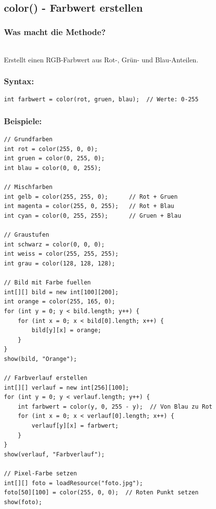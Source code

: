 \newpage


\subsection*{color() - Farbwert erstellen}

\subsubsection*{Was macht die Methode?}\\
Erstellt einen RGB-Farbwert aus Rot-, Grün- und Blau-Anteilen.

\subsubsection*{Syntax:}
\begin{lstlisting}
int farbwert = color(rot, gruen, blau);  // Werte: 0-255
\end{lstlisting}

\subsubsection*{Beispiele:}
\begin{lstlisting}
// Grundfarben
int rot = color(255, 0, 0);
int gruen = color(0, 255, 0);
int blau = color(0, 0, 255);

// Mischfarben
int gelb = color(255, 255, 0);      // Rot + Gruen
int magenta = color(255, 0, 255);   // Rot + Blau
int cyan = color(0, 255, 255);      // Gruen + Blau

// Graustufen
int schwarz = color(0, 0, 0);
int weiss = color(255, 255, 255);
int grau = color(128, 128, 128);

// Bild mit Farbe fuellen
int[][] bild = new int[100][200];
int orange = color(255, 165, 0);
for (int y = 0; y < bild.length; y++) {
    for (int x = 0; x < bild[0].length; x++) {
        bild[y][x] = orange;
    }
}
show(bild, "Orange");

// Farbverlauf erstellen
int[][] verlauf = new int[256][100];
for (int y = 0; y < verlauf.length; y++) {
    int farbwert = color(y, 0, 255 - y);  // Von Blau zu Rot
    for (int x = 0; x < verlauf[0].length; x++) {
        verlauf[y][x] = farbwert;
    }
}
show(verlauf, "Farbverlauf");

// Pixel-Farbe setzen
int[][] foto = loadResource("foto.jpg");
foto[50][100] = color(255, 0, 0);  // Roten Punkt setzen
show(foto);
\end{lstlisting}

